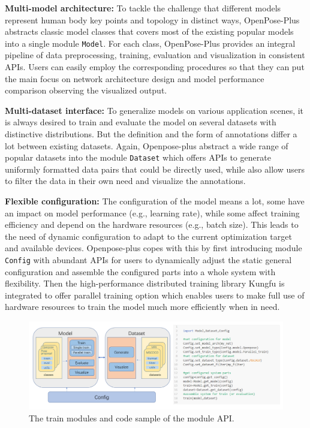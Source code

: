 \documentclass[twoside,11pt]{article}
\begin{document}
\textbf{Multi-model architecture:}
To tackle the challenge that different models represent human body key points and topology in distinct ways, OpenPose-Plus abstracts classic model classes that covers most of the existing popular models into a single module \texttt{Model}. For each class, OpenPose-Plus provides an integral pipeline of data preprocessing, training, evaluation and visualization in  consistent APIs. Users can easily employ the corresponding procedures so that they can put the main focus on network architecture design and model performance comparison observing the visualized output. 

\textbf{Multi-dataset interface:}
To generalize models on various application scenes, it is always desired to train and evaluate the model on several datasets with distinctive distributions. But the definition and the form of annotations differ a lot between existing datasets. Again, Openpose-plus abstract a wide range of popular datasets into the module \texttt{Dataset} which offers APIs to generate uniformly formatted data pairs that could be directly used, while also allow users to filter the data in their own need and visualize the annotations. 

\textbf{Flexible configuration:}
The configuration of the model means a lot, some have an impact on model performance (e.g., learning rate), while some affect training efficiency and depend on the hardware resources (e.g., batch size). This leads to the need of dynamic configuration to adapt to the current optimization target and available devices. Openpose-plus copes with this by first introducing module \texttt{Config} with abundant APIs for users to dynamically adjust the static general configuration and assemble the configured parts into a whole system with flexibility. Then the high-performance distributed training library Kungfu is integrated to offer parallel training option which enables users to make full use of hardware resources to train the model much more efficiently when in need.


\begin{figure}[h]
\centering
\includegraphics[width=0.9\linewidth]{ModuleAPI.png}
\caption{The train modules and code sample of the module API. }
\label{fig:ModuleAPI}
\end{figure}
\end{document}
